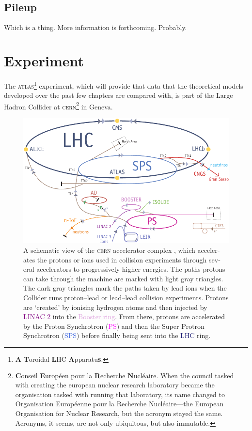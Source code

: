\begin{english}
\section{Pileup}

Which is a thing. More information is forthcoming. Probably.

\chapter{Experiment}\label{ch.exp}

The \textsc{atlas}\footnote{\textbf{A} \textbf{T}oroidal \textbf{L}HC \textbf{A}pparatu\textbf{s}.} experiment, which will provide that data that the theoretical models developed over the past few chapters are compared with, is part of the Large Hadron Collider at \textsc{cern}\footnote{\textbf{C}onseil \textbf{E}uropéen pour la \textbf{R}echerche \textbf{N}ucléaire. When the council tasked with creating the european nuclear research laboratory became the organisation tasked with running that laboratory, its name changed to Organisation Européenne pour la Recherche Nucléaire---the European Organisation for Nuclear Research, but the acronym stayed the same. Acronyms, it seems, are not only ubiquitous, but also immutable.} in Geneva.

\begin{figure}[htp]
\begin{center}
\includegraphics[width=.8\textwidth]{Cernrings}
\end{center}
\begin{minipage}[b]{\textwidth}
\caption{A schematic view of the \textsc{cern} accelerator complex \cite{cernbro}, which accelerates the protons or ions used in collision experiments through several accelerators to progressively higher energies. The paths protons can take through the machine are marked with light gray triangles. The dark gray triangles mark the paths taken by lead ions when the Collider runs proton--lead or lead--lead collision experiments. Protons are `created' by ionising hydrogen atoms and then injected by \textcolor{Purple}{LINAC 2} into the \textcolor{Plum}{Booster ring}. From there, protons are accelerated by the Proton Synchrotron (\textcolor{Magenta}{PS}) and then the Super Protron Synchrotron (\textcolor{RoyalBlue}{SPS}) before finally being sent into the \textcolor{MidnightBlue}{LHC} ring.}
\label{cernrings}
\end{minipage}
\end{figure}


\end{english}
